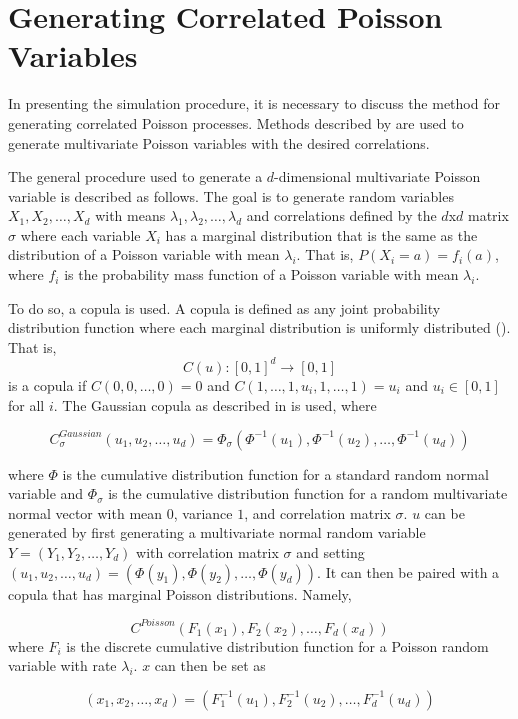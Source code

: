 \section{Generating Correlated Poisson Variables}\label{ch:generate_correlated_poisson}
In presenting the simulation procedure, it is necessary to discuss the method for generating correlated Poisson processes. Methods described by \cite{A8} are used to generate multivariate Poisson variables with the desired correlations. 

The general procedure used to generate a $d$-dimensional multivariate Poisson variable is described as follows. The goal is to generate random variables $X_1, X_2, \ldots, X_d$ with means $\lambda_1, \lambda_2, \ldots, \lambda_{d}$ and correlations defined by the $d$x$d$ matrix $\sigma$ where each variable $X_i$ has a marginal distribution that is the same as the distribution of a Poisson variable with mean $\lambda_i$. That is, $P(X_i = a) = f_i(a)$, where $f_i$ is the probability mass function of a Poisson variable with mean $\lambda_i$.

To do so, a copula is used. A copula is defined as any joint probability distribution function where each marginal distribution is uniformly distributed (\cite{B1}). That is, 
$$C(u): [0,1]^d \to [0,1]$$ 
is a copula if $C(0, 0, \ldots, 0) = 0$ and $C(1, \ldots, 1, u_i, 1, \ldots, 1) = u_i$ and $u_i \in [0,1]$ for all $i$. The Gaussian copula as described in \cite{A8} is used, where

$$ C_\sigma^{Gaussian}(u_1, u_2, \ldots, u_d) = \Phi_\sigma(\Phi^{-1}(u_1), \Phi^{-1}(u_2), \ldots,  \Phi^{-1}(u_d))$$

where $\Phi$ is the cumulative distribution function for a standard random normal variable and $\Phi_\sigma$ is the cumulative distribution function for a random multivariate normal vector with mean $0$, variance $1$, and correlation matrix $\sigma$. $u$ can be generated by first generating a multivariate normal random variable $Y = (Y_1,Y_2, \ldots, Y_d)$ with correlation matrix $\sigma$ and setting $(u_1, u_2, \ldots, u_d) = (\Phi(y_1), \Phi(y_2), \ldots,  \Phi(y_d))$. It can then be paired with a copula that has marginal Poisson distributions. Namely,

$$ C^{Poisson}(F_1(x_1), F_2(x_2), \ldots, F_d(x_d))$$ where $F_i$ is the discrete cumulative distribution function for a Poisson random variable with rate $\lambda_i$. $x$ can then be set as

$$(x_1, x_2, \ldots, x_d) = (F^{-1}_1(u_1), F^{-1}_2(u_2), \ldots, F^{-1}_d(u_d))$$


